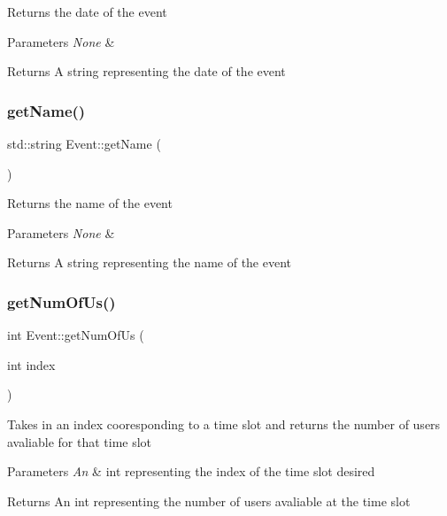 Returns the date of the event 
\begin{DoxyParams}{Parameters}
{\em None} & \\
\hline
\end{DoxyParams}
\begin{DoxyReturn}{Returns}
A string representing the date of the event 
\end{DoxyReturn}
\mbox{\label{class_event_adf0f3e50061123d6f24200661eeb66eb}} 
\subsubsection{\texorpdfstring{get\+Name()}{getName()}}
{\footnotesize\ttfamily std\+::string Event\+::get\+Name (\begin{DoxyParamCaption}{ }\end{DoxyParamCaption})}

Returns the name of the event 
\begin{DoxyParams}{Parameters}
{\em None} & \\
\hline
\end{DoxyParams}
\begin{DoxyReturn}{Returns}
A string representing the name of the event 
\end{DoxyReturn}
\mbox{\label{class_event_a00e5f70b33801f1081ccc434a276aca5}} 
\subsubsection{\texorpdfstring{get\+Num\+Of\+Us()}{getNumOfUs()}}
{\footnotesize\ttfamily int Event\+::get\+Num\+Of\+Us (\begin{DoxyParamCaption}\item[{int}]{index }\end{DoxyParamCaption})}

Takes in an index cooresponding to a time slot and returns the number of users avaliable for that time slot 
\begin{DoxyParams}{Parameters}
{\em An} & int representing the index of the time slot desired \\
\hline
\end{DoxyParams}
\begin{DoxyReturn}{Returns}
An int representing the number of users avaliable at the time slot 
\end{DoxyReturn}
\mbox{\label{class_event_a8087f742c473db50d2dda834de64ad1f}} 
